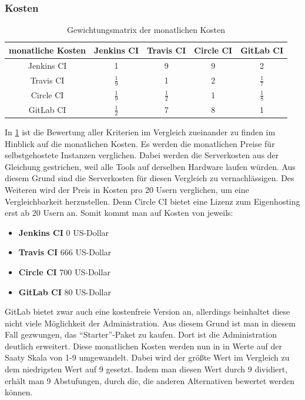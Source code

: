\subsubsection{Kosten}
\begin{table}[h!]
	\centering
	\begin{tabular}{c|cccc}
		monatliche Kosten   & Jenkins CI		 & Travis CI& Circle CI & GitLab CI   \\ 
		\hline
		Jenkins CI      & 1     		      &        9        &      9       &      2     \\
		Travis CI &   $\frac{1}{9}$     & 1               &  2&$\frac{1}{7}$      \\
		Circle CI   &   $\frac{1}{9}$     &  $\frac{1}{2}$   & 1            & $\frac{1}{8}$  \\
		GitLab CI    &    $\frac{1}{2}$    &  7   &        8      & 1           \\
	\end{tabular}
	\caption{Gewichtungsmatrix der monatlichen Kosten}
	\label{moncost}
\end{table}
In \ref{moncost} ist die Bewertung aller Kriterien im Vergleich zueinander zu finden im Hinblick auf die monatlichen Kosten. Es werden die monatlichen Preise für selbstgehostete Instanzen verglichen. Dabei werden die Serverkosten aus der Gleichung gestrichen, weil alle Tools auf derselben Hardware laufen würden. Aus diesem Grund sind die Serverkosten für diesen Vergleich zu vernachlässigen. Des Weiteren wird der Preis in Kosten pro 20 Usern verglichen, um eine Vergleichbarkeit herzustellen. Denn Circle CI bietet eine Lizenz zum Eigenhosting erst ab 20 Usern an. Somit kommt man auf Kosten von jeweils:
\begin{itemize}
	\item \textbf{Jenkins CI} 0 US-Dollar
	\item \textbf{Travis CI} 666 US-Dollar
	\item \textbf{Circle CI} 700 US-Dollar
	\item \textbf{GitLab CI} 80 US-Dollar
\end{itemize}
GitLab bietet zwar auch eine kostenfreie Version an, allerdings beinhaltet diese nicht viele Möglichkeit der Administration. Aus diesem Grund ist man in diesem Fall gezwungen, das \enquote{Starter}-Paket zu kaufen. Dort ist die Administration deutlich erweitert. Diese monatlichen Kosten werden nun in in Werte auf der Saaty Skala von 1-9 umgewandelt. Dabei wird der größte Wert im Vergleich zu dem niedrigsten Wert auf 9 gesetzt. Indem man diesen Wert durch 9 dividiert, erhält man 9 Abstufungen, durch die, die anderen Alternativen bewertet werden können.
